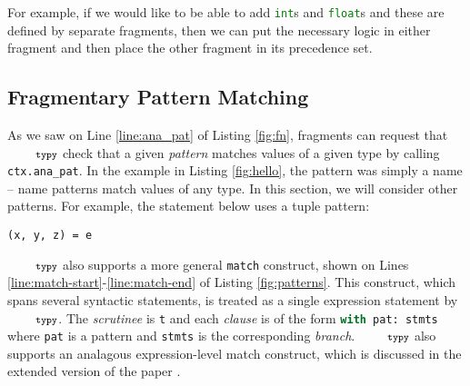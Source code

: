 \documentclass[10pt]{sigplanconf}
\newif\ifext
\newcommand{\typy}{\texttt{\footnotesize typy}}
\newcommand{\lip}[1]{\lstinline[language=Python,basicstyle=\ttfamily\footnotesize,morekeywords={with},deletendkeywords={tuple,buffer,map}]{#1}}
\newcommand{\li}[1]{\lip{#1}}
\begin{document}
For example, if we would like to be able to add \li{int}s and \li{float}s and these are defined by separate fragments, then we can put the necessary logic in either fragment and then place the other fragment in its precedence set.


\subsection{Fragmentary Pattern Matching}\label{sec:pattern-matching}
As we saw on Line \ref{line:ana_pat} of Listing \ref{fig:fn}, fragments can request that $\typy$ check that a given \emph{pattern} matches values of a given type by calling \li{ctx.ana_pat}. In the example in Listing \ref{fig:hello}, the pattern was simply a name -- name patterns match values of any type. In this section, we will consider other patterns. For example, the statement below uses a tuple pattern:
\vspace{-2px}\begin{lstlisting}[numbers=none]
(x, y, z) = e
\end{lstlisting}\vspace{-1px}

$\typy$ also supports a more general \li{match} construct, shown on Lines \ref{line:match-start}-\ref{line:match-end} of Listing \ref{fig:patterns}. This construct, which spans several syntactic statements, is treated as a single expression statement by $\typy$. The \emph{scrutinee} is \li{t} and each \emph{clause}  is of the form \li{with pat: stmts} where \li{pat} is a pattern and \li{stmts} is the corresponding \emph{branch}. $\typy$ also supports an analagous expression-level match construct, which is discussed in \ifext Appendix \ref{appendix:match-expressions}. \else the extended version of the paper \cite{gpce16tr}.\fi
\end{document}
